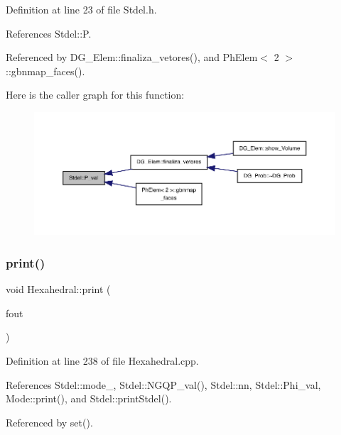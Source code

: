 Definition at line 23 of file Stdel.\+h.



References Stdel\+::P.



Referenced by D\+G\+\_\+\+Elem\+::finaliza\+\_\+vetores(), and Ph\+Elem$<$ 2 $>$\+::gbnmap\+\_\+faces().

Here is the caller graph for this function\+:
\nopagebreak
\begin{figure}[H]
\begin{center}
\leavevmode
\includegraphics[width=350pt]{classStdel_a701c7d5595d4f6632333c4202898983b_icgraph}
\end{center}
\end{figure}
\mbox{\label{classHexahedral_af30ff09b60c553acabb51c5aa27d8d22}} 
\subsubsection{\texorpdfstring{print()}{print()}}
{\footnotesize\ttfamily void Hexahedral\+::print (\begin{DoxyParamCaption}\item[{F\+I\+LE $\ast$}]{fout }\end{DoxyParamCaption})}



Definition at line 238 of file Hexahedral.\+cpp.



References Stdel\+::mode\+\_\+, Stdel\+::\+N\+G\+Q\+P\+\_\+val(), Stdel\+::nn, Stdel\+::\+Phi\+\_\+val, Mode\+::print(), and Stdel\+::print\+Stdel().



Referenced by set().


